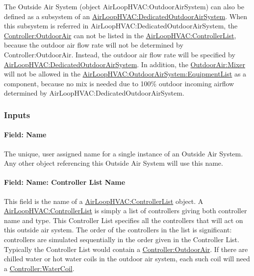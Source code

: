 The Outside Air System (object AirLoopHVAC:OutdoorAirSystem) can also be defined as a subsystem of an \hyperref[airloophvacdedicatedoutdoorairsystem]{AirLoopHVAC:DedicatedOutdoorAirSystem}. When this subsystem is referred in AirLoopHVAC:DedicatedOutdoorAirSystem, the \hyperref[controlleroutdoorair]{Controller:OutdoorAir} can not be listed in the \hyperref[airloophvaccontrollerlist]{AirLoopHVAC:ControllerList}, because the outdoor air flow rate will not be determined by Controller:OutdoorAir. Instead, the outdoor air flow rate will be specified by \hyperref[airloophvacdedicatedoutdoorairsystem]{AirLoopHVAC:DedicatedOutdoorAirSystem}.  In addition, the \hyperref[outdoorairmixer]{OutdoorAir:Mixer} will not be allowed in the \hyperref[airloophvacoutdoorairsystemequipmentlist]{AirLoopHVAC:OutdoorAirSystem:EquipmentList} as a component, because no mix is needed due to 100\% outdoor incoming airflow determined by AirLoopHVAC:DedicatedOutdoorAirSystem.     

\subsubsection{Inputs}\label{inputs-3-001}

\paragraph{Field: Name}\label{field-name-3-001}

The unique, user assigned name for a single instance of an Outside Air System. Any other object referencing this Outside Air System will use this name.

\paragraph{Field: Name: Controller List Name}\label{field-name-controller-list-name}

This field is the name of a \hyperref[airloophvaccontrollerlist]{AirLoopHVAC:ControllerList} object. A \hyperref[airloophvaccontrollerlist]{AirLoopHVAC:ControllerList} is simply a list of controllers giving both controller name and type. This Controller List specifies all the controllers that will act on this outside air system. The order of the controllers in the list is significant: controllers are simulated sequentially in the order given in the Controller List. Typically the Controller List would contain a \hyperref[controlleroutdoorair]{Controller:OutdoorAir}. If there are chilled water or hot water coils in the outdoor air system, each such coil will need a \hyperref[controllerwatercoil]{Controller:WaterCoil}.

